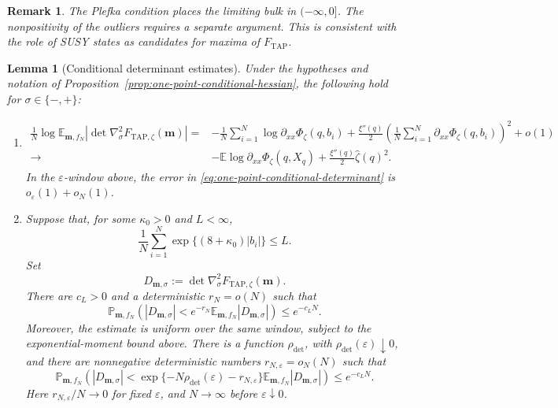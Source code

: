 \documentclass[a4paper,10pt,reqno]{amsart}
\numberwithin{equation}{section}
\newtheorem{lemma}[proposition]{Lemma}%
\newtheorem{remark}{Remark}[section]%
\newcommand{\ve}{\varepsilon}
\newcommand{\dP}{\mathbb{P}}%
\newcommand{\dE}{\mathbb{E}}%
\newcommand{\TAP}{\mathrm{TAP}}
\newcommand{\bfm}{\mathbf{m}}
\begin{document}
	\begin{remark}
		The Plefka condition places the limiting bulk in \((-\infty,0]\).
		The nonpositivity of the outliers requires a separate argument. This is
		consistent with the role of SUSY states as candidates for maxima of
		\(F_\TAP\).
	\end{remark}
	
	\begin{lemma}[Conditional determinant estimates]
		\label{lem:one-point-conditional-determinant}
		Under the hypotheses and notation of
		Proposition~\ref{prop:one-point-conditional-hessian}, the following
		hold for \(\sigma\in\{-,+\}\):
		\begin{enumerate}[label=\textup{(\roman*)}]
			\item
			\begin{equation}\label{eq:one-point-conditional-determinant}
				\begin{aligned}
					\frac1N
					\log\dE_{\bfm,f_N}
					\left|\det\nabla_\sigma^2F_{\TAP,\zeta}(\bfm)\right|
					={}&
					-\frac1N\sum_{i=1}^N
					\log\partial_{xx}\Phi_\zeta(q,b_i)
					+\frac{\xi''(q)}2
					\left(
					\frac1N\sum_{i=1}^N
					\partial_{xx}\Phi_\zeta(q,b_i)
					\right)^2
					+o(1)\\
					\longrightarrow{}&
					-\dE\log\partial_{xx}\Phi_\zeta(q,X_q)
					+\frac{\xi''(q)}2\widehat\zeta(q)^2 .
				\end{aligned}
			\end{equation}
			In the \(\ve\)-window above, the error in
			\eqref{eq:one-point-conditional-determinant} is
			\(o_\ve(1)+o_N(1)\).
			
			\item
			Suppose that, for some \(\kappa_0>0\) and \(L<\infty\),
			\[
			\frac1N\sum_{i=1}^N
			\exp\{(8+\kappa_0)|b_i|\}\le L.
			\]
			Set
			\[
			D_{\bfm,\sigma}
			:=
			\det\nabla_\sigma^2F_{\TAP,\zeta}(\bfm).
			\]
			There are \(c_L>0\) and a deterministic \(r_N=o(N)\) such that
			\begin{equation}\label{eq:one-point-determinant-lower-tail}
				\dP_{\bfm,f_N}\left(
				|D_{\bfm,\sigma}|
				<e^{-r_N}\dE_{\bfm,f_N}|D_{\bfm,\sigma}|
				\right)
				\le e^{-c_LN}.
			\end{equation}
			Moreover, the estimate is uniform over the same window, subject to the
			exponential-moment bound above. There is a function \(\rho_{\det}\),
			with \(\rho_{\det}(\ve)\downarrow0\), and there are nonnegative
			deterministic numbers \(r_{N,\ve}=o_N(N)\) such that
			\begin{equation}\label{eq:susy-one-point-determinant-lower-tail}
				\dP_{\bfm,f_N}\left(
				|D_{\bfm,\sigma}|
				<
				\exp\{-N\rho_{\det}(\ve)-r_{N,\ve}\}
				\dE_{\bfm,f_N}|D_{\bfm,\sigma}|
				\right)
				\le e^{-c_LN}.
			\end{equation}
			Here \(r_{N,\ve}/N\to0\) for fixed \(\ve\), and \(N\to\infty\)
			before \(\ve\downarrow0\).
		\end{enumerate}
	\end{lemma}
	
\end{document}

